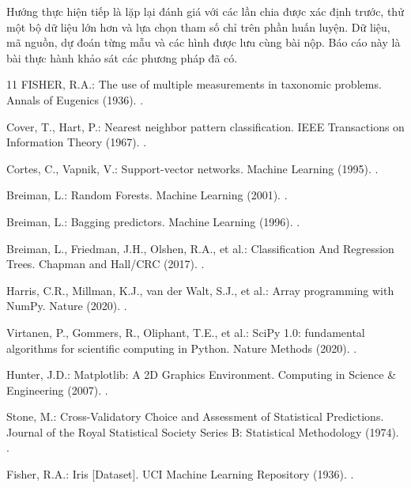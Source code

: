 \documentclass[runningheads]{llncs}
\begin{document}
Hướng thực hiện tiếp là lặp lại đánh giá với các lần chia được xác định trước, thử một bộ dữ liệu lớn hơn và lựa chọn tham số chỉ trên phần huấn luyện. Dữ liệu, mã nguồn, dự đoán từng mẫu và các hình được lưu cùng bài nộp. Báo cáo này là bài thực hành khảo sát các phương pháp đã có.

\begin{thebibliography}{11}
 FISHER, R.A.: The use of multiple measurements in taxonomic problems. Annals of Eugenics (1936). .

 Cover, T., Hart, P.: Nearest neighbor pattern classification. IEEE Transactions on Information Theory (1967). .

 Cortes, C., Vapnik, V.: Support-vector networks. Machine Learning (1995). .

 Breiman, L.: Random Forests. Machine Learning (2001). .

 Breiman, L.: Bagging predictors. Machine Learning (1996). .

 Breiman, L., Friedman, J.H., Olshen, R.A., et al.: Classification And Regression Trees. Chapman and Hall/CRC (2017). .

 Harris, C.R., Millman, K.J., van der Walt, S.J., et al.: Array programming with NumPy. Nature (2020). .

 Virtanen, P., Gommers, R., Oliphant, T.E., et al.: SciPy 1.0: fundamental algorithms for scientific computing in Python. Nature Methods (2020). .

 Hunter, J.D.: Matplotlib: A 2D Graphics Environment. Computing in Science \& Engineering (2007). .

 Stone, M.: Cross-Validatory Choice and Assessment of Statistical Predictions. Journal of the Royal Statistical Society Series B: Statistical Methodology (1974). .

 Fisher, R.A.: Iris [Dataset]. UCI Machine Learning Repository (1936). .
\end{thebibliography}
\end{document}
